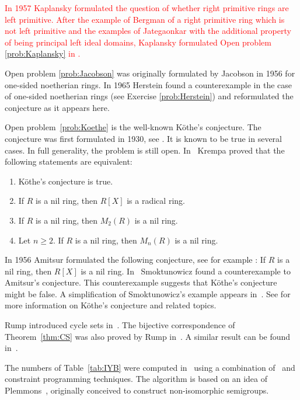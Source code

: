 \textcolor{red}{In 1957 \cite{MR0096696} Kaplansky formulated the question of whether right primitive rings are left primitive. After the example of Bergman of a right primitive ring which is not left primitive \cite{MR175940,MR167497} and the examples of Jategaonkar \cite{MR0240131} with the additional property of being principal left ideal domains, Kaplansky formulated Open problem \ref{prob:Kaplansky} in  \cite{MR0099359}. }

Open problem \ref{prob:Jacobson} was originally formulated by Jacobson in 1956 \cite{MR0222106} 
for one-sided noetherian rings. In 1965 Herstein \cite{MR188253} found a counterexample
in the case of one-sided noetherian rings (see Exercise \ref{prob:Herstein})
and reformulated the conjecture as it appears here. 

Open problem~\ref{prob:Koethe} is the well-known K\"othe's conjecture. 
The conjecture was first formulated in 1930, see \cite{MR1545158}. It is known to be true
in several cases. In full generality, the problem is still open. In~\cite{MR306251} 
Krempa proved that
the following statements are equivalent:
\begin{enumerate}
	\item K\"othe's conjecture is true.  
	\item If $R$ is a nil ring, then $R[X]$ is a radical ring. 
	\item If $R$ is a nil ring, then $M_2(R)$ is a nil ring. 
	\item Let $n\geq2$. If $R$ is a nil ring, then $M_n(R)$ is a nil ring. 
\end{enumerate}

In 1956 Amitsur formulated the following conjecture, see for example
\cite{MR0347873}: If $R$ is a nil ring, then $R[X]$ is a nil ring. In~\cite{MR1793911} 
Smoktunowicz found a counterexample to Amitsur's conjecture. 
This counterexample suggests that K\"othe's conjecture might be false. 
A simplification of Smoktunowicz's example
appears in~\cite{MR3169522}. See \cite{MR1879880,MR2275597} for more
information on K\"othe's conjecture and related topics. 


Rump introduced cycle sets in~\cite{MR2132760}. The bijective correspondence of 
Theorem~\ref{thm:CS} was 
also proved by Rump in~\cite{MR2132760}. A similar result can be 
found in~\cite[Proposition 2.2]{MR1722951}. 

The numbers of Table~\ref{tab:IYB} were computed in~\cite{MR4405502}
using a combination of~\cite{GAP4} and constraint programming techniques. 
The algorithm is based on an idea of Plemmons~\cite{MR0258994}, originally 
conceived to construct non-isomorphic semigroups.  

